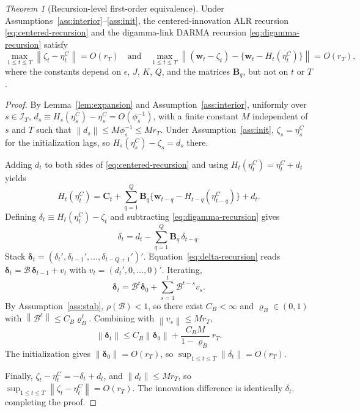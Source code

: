 \documentclass[12pt]{article}
\theoremstyle{remark}
\newtheorem{thm}{Theorem}
\newcommand{\norm}[1]{\left\lVert#1\right\rVert}
\newcommand{\bfB}{\mathbf{B}}
\newcommand{\bfC}{\mathbf{C}}
\newcommand{\bfw}{\mathbf{w}}
\begin{document}
\begin{thm}[Recursion-level first-order equivalence]\label{thm:equiv}
Under Assumptions~\ref{ass:interior}--\ref{ass:init}, the centered-innovation ALR recursion \eqref{eq:centered-recursion} and the digamma-link DARMA recursion \eqref{eq:digamma-recursion} satisfy
\[
\max_{1\le t\le T}\norm{\zeta_t-\eta_t^{C}} = O(r_T)
\quad\text{and}\quad
\max_{1\le t\le T}\norm{(\bfw_t-\zeta_t)-\{\bfw_t-H_t(\eta_t^{C})\}}=O(r_T),
\]
where the constants depend on $\epsilon$, $J$, $K$, $Q$, and the matrices $\bfB_q$, but not on $t$ or $T$.
\end{thm}

\begin{proof}
By Lemma~\ref{lem:expansion} and Assumption~\ref{ass:interior}, uniformly over $s\in\mathcal{I}_T$,
$d_s\equiv H_s(\eta_s^{C})-\eta_s^{C}=O(\phi_s^{-1})$, with a finite constant $M$ independent of $s$ and $T$ such that $\norm{d_s}\le M\phi_s^{-1}\le Mr_T$. Under Assumption~\ref{ass:init}, $\zeta_s=\eta_s^{C}$ for the initialization lags, so $H_s(\eta_s^{C})-\zeta_s=d_s$ there.

Adding $d_t$ to both sides of \eqref{eq:centered-recursion} and using $H_t(\eta_t^C)=\eta_t^C+d_t$ yields
\[
H_t(\eta_t^{C})=\bfC_t+\sum_{q=1}^Q \bfB_q\{\bfw_{t-q}-H_{t-q}(\eta_{t-q}^{C})\}+d_t.
\]
Defining $\delta_t\equiv H_t(\eta_t^{C})-\zeta_t$ and subtracting \eqref{eq:digamma-recursion} gives
\begin{equation}\label{eq:delta-recursion}
\delta_t=d_t-\sum_{q=1}^Q \bfB_q\,\delta_{t-q}.
\end{equation}
Stack $\bm{\delta}_t=(\delta_t',\delta_{t-1}',\ldots,\delta_{t-Q+1}')'$. Equation~\eqref{eq:delta-recursion} reads $\bm{\delta}_t=\mathcal{B}\,\bm{\delta}_{t-1}+v_t$ with $v_t=(d_t',0,\ldots,0)'$. Iterating,
\[
\bm{\delta}_t=\mathcal{B}^{t}\bm{\delta}_0+\sum_{s=1}^{t}\mathcal{B}^{t-s}v_s.
\]
By Assumption~\ref{ass:stab}, $\rho(\mathcal{B})<1$, so there exist $C_B<\infty$ and $\varrho_B\in(0,1)$ with $\norm{\mathcal{B}^\ell}\le C_B\varrho_B^\ell$. Combining with $\norm{v_s}\le Mr_T$,
\[
\norm{\bm{\delta}_t}\le C_B\norm{\bm{\delta}_0}+\frac{C_B M}{1-\varrho_B}\,r_T.
\]
The initialization gives $\norm{\bm{\delta}_0}=O(r_T)$, so $\sup_{1\le t\le T}\norm{\delta_t}=O(r_T)$.

Finally, $\zeta_t-\eta_t^{C}=-\delta_t+d_t$, and $\norm{d_t}\le Mr_T$, so $\sup_{1\le t\le T}\norm{\zeta_t-\eta_t^{C}}=O(r_T)$. The innovation difference is identically $\delta_t$, completing the proof.
\end{proof}
\end{document}
